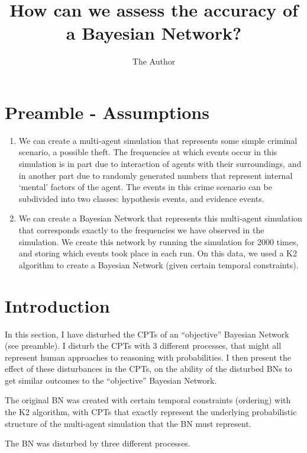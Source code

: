 \documentclass[11pt]{amsart}
\title{How can we assess the accuracy of a Bayesian Network?}
\author{The Author}
\begin{document}
\maketitle

\section{Preamble - Assumptions}
\begin{enumerate}
\item We can create a multi-agent simulation that represents some simple criminal scenario, a possible theft. The frequencies at which events occur in this simulation is in part due to interaction of agents with their surroundings, and in another part due to randomly generated numbers that represent internal `mental' factors of the agent. The events in this crime scenario can be subdivided into two classes: hypothesis events, and evidence events.
\item We can create a Bayesian Network that represents this multi-agent simulation that corresponds exactly to the frequencies we have observed in the simulation. We create this network by running the simulation for 2000 times, and storing which events took place in each run. On this data, we used a K2 algorithm to create a Bayesian Network (given certain temporal constraints).
\end{enumerate}


\section{Introduction}
In this section, I have disturbed the CPTs of an ``objective'' Bayesian Network (see preamble). I disturb the CPTs with 3 different processes, that might all represent human approaches to reasoning with probabilities. I then present the effect of these disturbances in the CPTs, on the ability of the disturbed BNs to get similar outcomes to the ``objective'' Bayesian Network. 

 The original BN was created with certain temporal constraints (ordering) with the K2 algorithm, with CPTs that exactly represent the underlying probabilistic structure of the multi-agent simulation that the BN must represent.

The BN was disturbed by three different processes.
\end{document}
